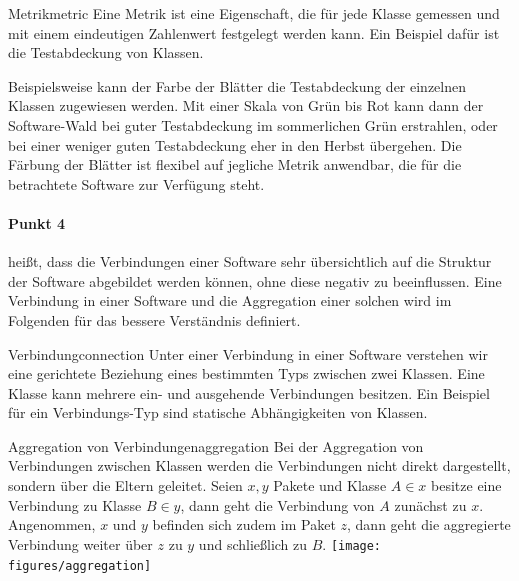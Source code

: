 \begin{defbox}{Metrik}{metric}
  Eine Metrik ist eine Eigenschaft, die für jede Klasse gemessen und mit einem eindeutigen Zahlenwert festgelegt werden kann. Ein Beispiel dafür ist die Testabdeckung von Klassen.
\end{defbox}

Beispielsweise kann der Farbe der Blätter die Testabdeckung der einzelnen Klassen zugewiesen werden. Mit einer Skala von Grün bis Rot kann dann der Software-Wald bei guter Testabdeckung im sommerlichen Grün erstrahlen, oder bei einer weniger guten Testabdeckung eher in den Herbst übergehen. Die Färbung der Blätter ist flexibel auf jegliche Metrik anwendbar, die für die betrachtete Software zur Verfügung steht.

\paragraph{Punkt 4} heißt, dass die Verbindungen einer Software sehr übersichtlich auf die Struktur der Software abgebildet werden können, ohne diese negativ zu beeinflussen. Eine Verbindung in einer Software und die Aggregation einer solchen wird im Folgenden für das bessere Verständnis definiert.

\begin{defboxfullwidth}{Verbindung}{connection}
Unter einer Verbindung in einer Software verstehen wir eine gerichtete Beziehung eines bestimmten Typs zwischen zwei Klassen. Eine Klasse kann mehrere ein- und ausgehende Verbindungen besitzen. Ein Beispiel für ein Verbindungs-Typ sind statische Abhängigkeiten von Klassen.
\end{defboxfullwidth}



\begin{splitbox}{Aggregation von Verbindungen}{aggregation}
Bei der Aggregation von Verbindungen zwischen Klassen werden die Verbindungen nicht direkt dargestellt, sondern über die Eltern geleitet. Seien $x, y$ Pakete und Klasse $A \in x$ besitze eine Verbindung zu Klasse $B \in y$, dann geht die Verbindung von $A$ zunächst zu $x$. Angenommen, $x$ und $y$ befinden sich zudem im Paket $z$, dann geht die aggregierte Verbindung weiter über $z$ zu $y$ und schließlich zu $B$.
\tcblower
\texttt{[image: figures/aggregation]}
\end{splitbox}

